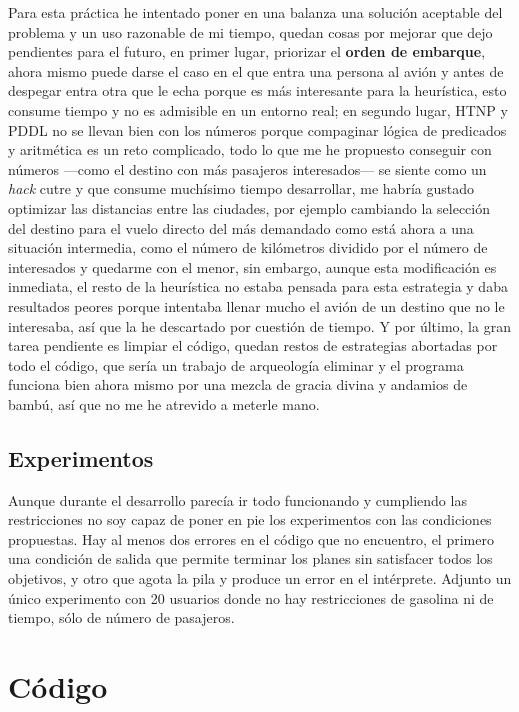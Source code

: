\documentclass{article}
\begin{document}
\begin{enumerate}
	Para esta práctica he intentado poner en una balanza una solución aceptable del problema y un uso razonable de mi tiempo, quedan cosas por mejorar que dejo pendientes para el futuro, en primer lugar, priorizar el \textbf{orden de embarque}, ahora mismo puede darse el caso en el que entra una persona al avión y antes de despegar entra otra que le echa porque es más interesante para la heurística, esto consume tiempo y no es admisible en un entorno real; en segundo lugar, HTNP y PDDL no se llevan bien con los números porque compaginar lógica de predicados y aritmética es un reto complicado, todo lo que me he propuesto conseguir con números ---como el destino con más pasajeros interesados--- se siente como un \emph{hack} cutre y que consume muchísimo tiempo desarrollar, me habría gustado optimizar las distancias entre las ciudades, por ejemplo cambiando la selección del destino para el vuelo directo del más demandado como está ahora a una situación intermedia, como el número de kilómetros dividido por el número de interesados y quedarme con el menor, sin embargo, aunque esta modificación es inmediata, el resto de la heurística no estaba pensada para esta estrategia y daba resultados peores porque intentaba llenar mucho el avión de un destino que no le interesaba, así que la he descartado por cuestión de tiempo. Y por último, la gran tarea pendiente es limpiar el código, quedan restos de estrategias abortadas por todo el código, que sería un trabajo de arqueología eliminar y el programa funciona bien ahora mismo por una mezcla de gracia divina y andamios de bambú, así que no me he atrevido a meterle mano.	
	
\end{enumerate}

\subsection*{Experimentos}

	Aunque durante el desarrollo parecía ir todo funcionando y cumpliendo las restricciones no soy capaz de poner en pie los experimentos con las condiciones propuestas. Hay al menos dos errores en el código que no encuentro, el primero una condición de salida que permite terminar los planes sin satisfacer todos los objetivos, y otro que agota la pila y produce un error en el intérprete. Adjunto un único experimento con 20 usuarios donde no hay restricciones de gasolina ni de tiempo, sólo de número de pasajeros.

\section*{Código}
\end{document}

